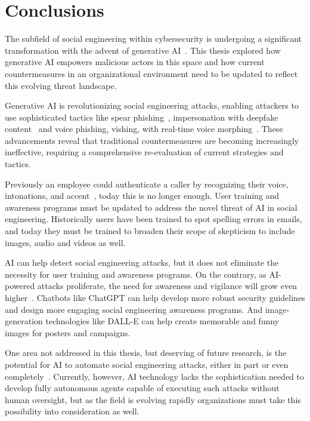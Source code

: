 \chapter{Conclusions\label{chapter:conclusions}}
\begin{comment}
\end{comment}

The subfield of social engineering within cybersecurity is undergoing a significant transformation with the advent of generative AI~\citep{fakhouri_AI_Driven_Solutions_SE_Attacks_2024}. This thesis explored how generative AI empowers malicious actors in this space and how current countermeasures in an organizational environment need to be updated to reflect this evolving threat landscape.

Generative AI is revolutionizing social engineering attacks, enabling attackers to use sophisticated tactics like spear phishing~\citep{basit_Comprehensive_Survey_AI_Phishing_Detection_2021}, impersonation with deepfake content~\citep{mirsky_Creation_Detection_Deepfakes_2021} and voice phishing, vishing, with real-time voice morphing~\citep{doan_BTSE_Audio_Deepfake_Detection_2023}. These advancements reveal that traditional countermeasures are becoming increasingly ineffective, requiring a comprehensive re-evaluation of current strategies and tactics.

Previously an employee could authenticate a caller by recognizing their voice, intonations, and accent~\citep{mitnick_The_Art_of_Deception_2003}, today this is no longer enough. User training and awareness programs must be updated to address the novel threat of AI in social engineering. Historically users have been trained to spot spelling errors in emails, and today they must be trained to broaden their scope of skepticism to include images, audio and videos as well.

AI can help detect social engineering attacks, but it does not eliminate the necessity for user training and awareness programs. On the contrary, as AI-powered attacks proliferate, the need for awareness and vigilance will grow even higher~\citep{fakhouri_AI_Driven_Solutions_SE_Attacks_2024}. Chatbots like ChatGPT can help develop more robust security guidelines and design more engaging social engineering awareness programs. And image-generation technologies like DALL-E can help create memorable and funny images for posters and campaigns.

One area not addressed in this thesis, but deserving of future research, is the potential for AI to automate social engineering attacks, either in part or even completely~\citep{mirsky_Threat_Offensive_AI_Organizations_2023}. Currently, however, AI technology lacks the sophistication needed to develop fully autonomous agents capable of executing such attacks without human oversight, but as the field is evolving rapidly organizations must take this possibility into consideration as well.


